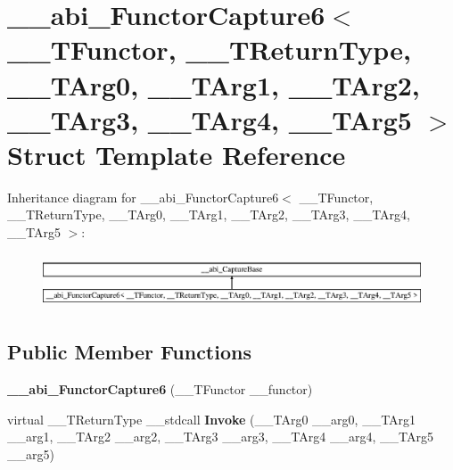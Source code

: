 \hypertarget{struct____abi___functor_capture6}{}\section{\+\_\+\+\_\+abi\+\_\+\+Functor\+Capture6$<$ \+\_\+\+\_\+\+T\+Functor, \+\_\+\+\_\+\+T\+Return\+Type, \+\_\+\+\_\+\+T\+Arg0, \+\_\+\+\_\+\+T\+Arg1, \+\_\+\+\_\+\+T\+Arg2, \+\_\+\+\_\+\+T\+Arg3, \+\_\+\+\_\+\+T\+Arg4, \+\_\+\+\_\+\+T\+Arg5 $>$ Struct Template Reference}
\label{struct____abi___functor_capture6}
Inheritance diagram for \+\_\+\+\_\+abi\+\_\+\+Functor\+Capture6$<$ \+\_\+\+\_\+\+T\+Functor, \+\_\+\+\_\+\+T\+Return\+Type, \+\_\+\+\_\+\+T\+Arg0, \+\_\+\+\_\+\+T\+Arg1, \+\_\+\+\_\+\+T\+Arg2, \+\_\+\+\_\+\+T\+Arg3, \+\_\+\+\_\+\+T\+Arg4, \+\_\+\+\_\+\+T\+Arg5 $>$\+:\begin{figure}[H]
\begin{center}
\leavevmode
\includegraphics[height=1.632653cm]{d1/d54/struct____abi___functor_capture6}
\end{center}
\end{figure}
\subsection*{Public Member Functions}
\begin{DoxyCompactItemize}
\item 
\mbox{\label{struct____abi___functor_capture6_ae8862ba92cf46325bc32df82add5a368}} 
{\bfseries \+\_\+\+\_\+abi\+\_\+\+Functor\+Capture6} (\+\_\+\+\_\+\+T\+Functor \+\_\+\+\_\+functor)
\item 
\mbox{\label{struct____abi___functor_capture6_a6f1fad79b8a649fe7e9428e2da50f4ef}} 
virtual \+\_\+\+\_\+\+T\+Return\+Type \+\_\+\+\_\+stdcall {\bfseries Invoke} (\+\_\+\+\_\+\+T\+Arg0 \+\_\+\+\_\+arg0, \+\_\+\+\_\+\+T\+Arg1 \+\_\+\+\_\+arg1, \+\_\+\+\_\+\+T\+Arg2 \+\_\+\+\_\+arg2, \+\_\+\+\_\+\+T\+Arg3 \+\_\+\+\_\+arg3, \+\_\+\+\_\+\+T\+Arg4 \+\_\+\+\_\+arg4, \+\_\+\+\_\+\+T\+Arg5 \+\_\+\+\_\+arg5)
\end{DoxyCompactItemize}
